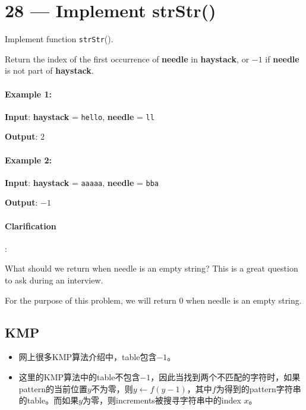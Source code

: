 \section{28 --- Implement strStr()}
Implement function \texttt{strStr}().

Return the index of the first occurrence of \textbf{needle} in \textbf{haystack}, or $-1$ if \textbf{needle} is not part of \textbf{haystack}.

\paragraph{Example 1:}

\begin{flushleft}
\textbf{Input}: \textbf{haystack} = \texttt{hello}, \textbf{needle} = \texttt{ll}


\textbf{Output}: 2
\end{flushleft}

\paragraph{Example 2:}

\begin{flushleft}
\textbf{Input}: \textbf{haystack} = \texttt{aaaaa}, \textbf{needle} = \texttt{bba}

\textbf{Output}: $-1$
\end{flushleft}

\paragraph{Clarification}:

\begin{flushleft}
What should we return when needle is an empty string? This is a great question to ask during an interview.

For the purpose of this problem, we will return 0 when needle is an empty string. 
\end{flushleft}

\subsection{KMP}
\begin{itemize}
\item 网上很多KMP算法介绍中，table包含$-1$。
\item 这里的KMP算法中的table不包含$-1$，因此当找到两个不匹配的字符时，如果pattern的当前位置$y$不为零，则$y\gets f(y-1)$，其中$f$为得到的pattern字符串的table。而如果$y$为零，则increments被搜寻字符串中的index $x$。
\end{itemize}

